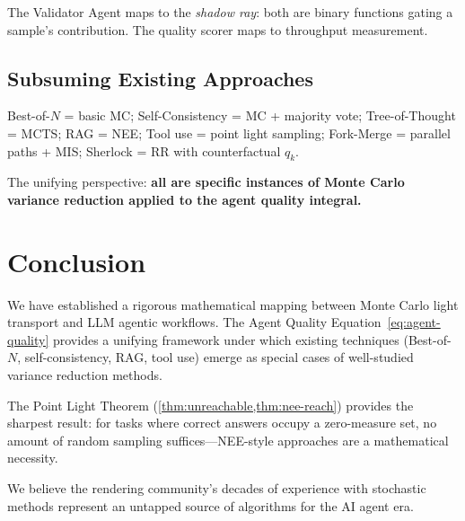 \documentclass[11pt,twocolumn]{article}
\theoremstyle{definition}
\begin{document}
The Validator Agent maps to the \emph{shadow ray}:
both are binary functions gating a sample's contribution.
The quality scorer maps to throughput measurement.

\subsection{Subsuming Existing Approaches}

Best-of-$N$ = basic MC;
Self-Consistency = MC + majority vote;
Tree-of-Thought = MCTS;
RAG = NEE;
Tool use = point light sampling;
Fork-Merge = parallel paths + MIS;
Sherlock = RR with counterfactual $q_k$.

The unifying perspective: \textbf{all are specific instances of
Monte Carlo variance reduction applied to the agent quality integral.}

\section{Conclusion}\label{sec:conclusion}

We have established a rigorous mathematical mapping between
Monte Carlo light transport and LLM agentic workflows.
The Agent Quality Equation~\eqref{eq:agent-quality} provides
a unifying framework under which existing techniques
(Best-of-$N$, self-consistency, RAG, tool use)
emerge as special cases of well-studied variance reduction methods.

The Point Light Theorem (\cref{thm:unreachable,thm:nee-reach})
provides the sharpest result:
for tasks where correct answers occupy a zero-measure set,
no amount of random sampling suffices---NEE-style approaches
are a mathematical necessity.

We believe the rendering community's decades of experience
with stochastic methods represent an untapped source of algorithms
for the AI agent era.


\end{document}
